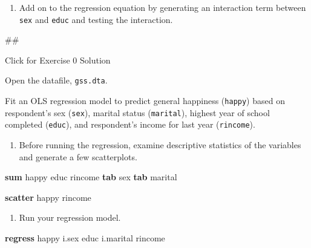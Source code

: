 \documentclass[
]{book}
\newenvironment{Shaded}{\begin{snugshade}}{\end{snugshade}}
\newcommand{\KeywordTok}[1]{\textcolor[rgb]{0.13,0.29,0.53}{\textbf{#1}}}
\newcommand{\NormalTok}[1]{#1}
\providecommand{\tightlist}{%
  \setlength{\itemsep}{0pt}\setlength{\parskip}{0pt}}
\begin{document}
\begin{enumerate}
\def\labelenumi{\arabic{enumi}.}
\setcounter{enumi}{3}
\tightlist
\item
  Add on to the regression equation by generating an interaction term between \texttt{sex} and \texttt{educ} and testing the interaction.
\end{enumerate}

\begin{Shaded}
\begin{Highlighting}[]
\NormalTok{\#\#}
\end{Highlighting}
\end{Shaded}

{Click for Exercise 0 Solution}

\begin{alert}

Open the datafile, \texttt{gss.dta}.

Fit an OLS regression model to predict general happiness (\texttt{happy}) based on respondent's sex (\texttt{sex}), marital status (\texttt{marital}), highest year of school completed (\texttt{educ}), and respondent's income for last year (\texttt{rincome}).

\begin{enumerate}
\def\labelenumi{\arabic{enumi}.}
\tightlist
\item
  Before running the regression, examine descriptive statistics of the variables and generate a few scatterplots.
\end{enumerate}

\begin{Shaded}
\begin{Highlighting}[]
\KeywordTok{sum}\NormalTok{ happy educ rincome }
\KeywordTok{tab}\NormalTok{ sex }
\KeywordTok{tab}\NormalTok{ marital }

\KeywordTok{scatter}\NormalTok{ happy rincome}
\end{Highlighting}
\end{Shaded}

\begin{enumerate}
\def\labelenumi{\arabic{enumi}.}
\setcounter{enumi}{1}
\tightlist
\item
  Run your regression model.
\end{enumerate}

\begin{Shaded}
\begin{Highlighting}[]
\KeywordTok{regress}\NormalTok{ happy i.sex educ i.marital rincome}
\end{Highlighting}
\end{Shaded}


\end{alert}
\end{document}

